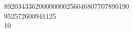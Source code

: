 \begin{tabbing}
892034336200000000256046807707890190\\[0pt]
9\>52572600941125\\[0pt]
10\>\end{tabbing}
